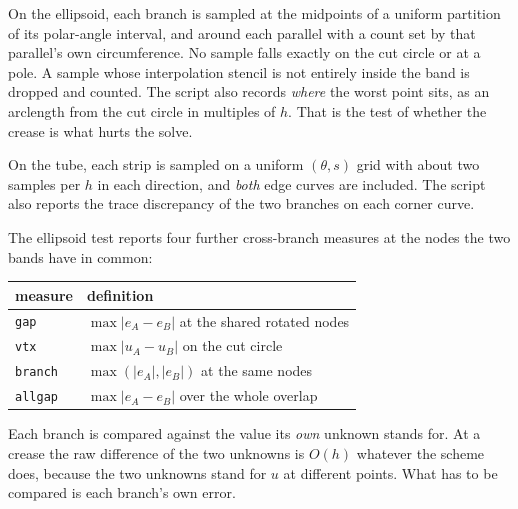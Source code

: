 On the ellipsoid, each branch is sampled at the midpoints of a uniform
partition of its polar-angle interval, and around each parallel with a
count set by that parallel's own circumference. No sample falls exactly
on the cut circle or at a pole. A sample whose interpolation stencil is
not entirely inside the band is dropped and counted. The script also
records \emph{where} the worst point sits, as an arclength from the cut
circle in multiples of $h$. That is the test of whether the crease is
what hurts the solve.

On the tube, each strip is sampled on a uniform $(\theta,s)$ grid with
about two samples per $h$ in each direction, and \emph{both} edge curves
are included. The script also reports the trace discrepancy of the two
branches on each corner curve.

The ellipsoid test reports four further cross-branch measures at the
nodes the two bands have in common:
\begin{center}
\begin{tabular}{ll}
  \toprule
  measure & definition \\
  \midrule
  \texttt{gap}    & $\max|e_A - e_B|$ at the shared rotated nodes \\
  \texttt{vtx}    & $\max|u_A - u_B|$ on the cut circle \\
  \texttt{branch} & $\max(|e_A|, |e_B|)$ at the same nodes \\
  \texttt{allgap} & $\max|e_A - e_B|$ over the whole overlap \\
  \bottomrule
\end{tabular}
\end{center}
Each branch is compared against the value its \emph{own} unknown stands
for. At a crease the raw difference of the two unknowns is $O(h)$
whatever the scheme does, because the two unknowns stand for $u$ at
different points. What has to be compared is each branch's own error.
